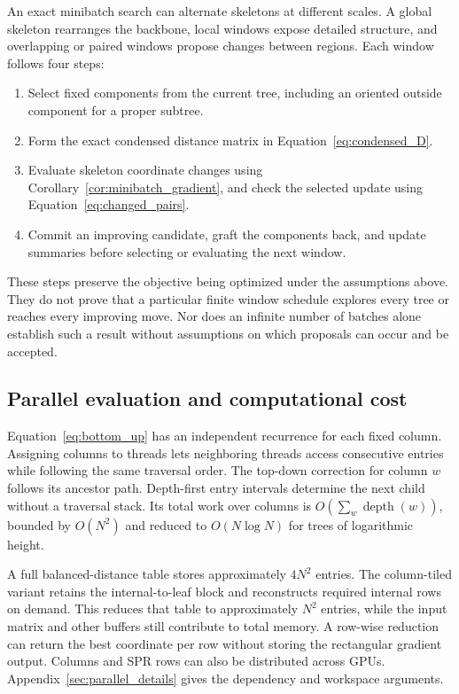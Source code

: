 \documentclass[11pt,a4paper]{article}
\makeatletter
\DeclareRobustCommand{\_}{\ifmmode\nfss@text{\textunderscore}\else\textunderscore\allowbreak\fi}
\theoremstyle{definition}
\makeatother
\begin{document}
An exact minibatch search can alternate skeletons at different scales.
A global skeleton rearranges the backbone, local windows expose detailed structure, and overlapping or paired windows propose changes between regions.
Each window follows four steps:
\begin{enumerate}
 \item Select fixed components from the current tree, including an oriented outside component for a proper subtree.
 \item Form the exact condensed distance matrix in Equation~\eqref{eq:condensed_D}.
 \item Evaluate skeleton coordinate changes using Corollary~\ref{cor:minibatch_gradient}, and check the selected update using Equation~\eqref{eq:changed_pairs}.
 \item Commit an improving candidate, graft the components back, and update summaries before selecting or evaluating the next window.
\end{enumerate}
These steps preserve the objective being optimized under the assumptions above.
They do not prove that a particular finite window schedule explores every tree or reaches every improving move.
Nor does an infinite number of batches alone establish such a result without assumptions on which proposals can occur and be accepted.

\subsection{Parallel evaluation and computational cost}
\label{sec:parallel}

Equation~\eqref{eq:bottom_up} has an independent recurrence for each fixed column.
Assigning columns to threads lets neighboring threads access consecutive entries while following the same traversal order.
The top-down correction for column $w$ follows its ancestor path.
Depth-first entry intervals determine the next child without a traversal stack.
Its total work over columns is $O(\sum_w\operatorname{depth}(w))$, bounded by $O(N^2)$ and reduced to $O(N\log N)$ for trees of logarithmic height.

A full balanced-distance table stores approximately $4N^2$ entries.
The column-tiled variant retains the internal-to-leaf block and reconstructs required internal rows on demand.
This reduces that table to approximately $N^2$ entries, while the input matrix and other buffers still contribute to total memory.
A row-wise reduction can return the best coordinate per row without storing the rectangular gradient output.
Columns and SPR rows can also be distributed across GPUs.
Appendix~\ref{sec:parallel_details} gives the dependency and workspace arguments.
\end{document}
